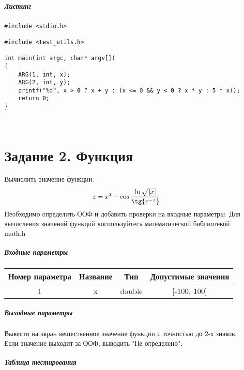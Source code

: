 \paragraph{Листинг}
\begin{lstlisting}
#include <stdio.h>

#include <test_utils.h>

int main(int argc, char* argv[])
{
	ARG(1, int, x);
	ARG(2, int, y);
	printf("%d", x > 0 ? x + y : (x <= 0 && y < 0 ? x * y : 5 * x));
	return 0;
}

\end{lstlisting}
\\
\chapter*{Задание 2. Функция}

Вычислить значение функции:\\\n\begin{equation*}z = x^2 - \cos{\frac{\ln{ \sqrt{|x|} } }{\tg{e^{-x}}} }\end{equation*}
Необходимо определить ООФ и добавить проверки на входные параметры.
Для вычисления значений функций воспользуйтесь математической библиотекой math.h

\paragraph{Входные параметры}

\begin{tabular}{ |c|c|c|c| }
\hline
Номер параметра & Название & Тип & Допустимые значения \\ 
 \hline
1 & x & double & [-100, 100] \\ 
 \hline

\end{tabular}


\paragraph{Выходные параметры}

Вывести на экран вещественное значение функции с точностью до 2-х знаков.
Если значение выходит за ООФ, выводить "Не определено".

\paragraph{Таблица тестирования}

